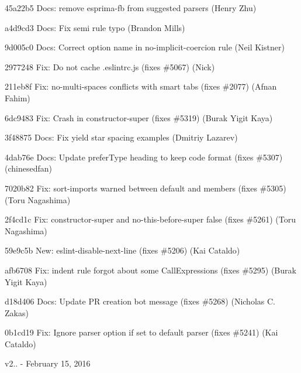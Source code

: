 \begin{DoxyItemize}
\item 45a22b5 Docs\+: remove esprima-\/fb from suggested parsers (Henry Zhu)
\item a4d9cd3 Docs\+: Fix semi rule typo (Brandon Mills)
\item 9d005c0 Docs\+: Correct option name in {\ttfamily no-\/implicit-\/coercion} rule (Neil Kistner)
\item 2977248 Fix\+: Do not cache {\ttfamily .eslintrc.\+js} (fixes \#5067) (Nick)
\item 211eb8f Fix\+: no-\/multi-\/spaces conflicts with smart tabs (fixes \#2077) (Afnan Fahim)
\item 6dc9483 Fix\+: Crash in {\ttfamily constructor-\/super} (fixes \#5319) (Burak Yigit Kaya)
\item 3f48875 Docs\+: Fix yield star spacing examples (Dmitriy Lazarev)
\item 4dab76e Docs\+: Update {\ttfamily prefer\+Type} heading to keep code format (fixes \#5307) (chinesedfan)
\item 7020b82 Fix\+: {\ttfamily sort-\/imports} warned between default and members (fixes \#5305) (Toru Nagashima)
\item 2f4cd1c Fix\+: {\ttfamily constructor-\/super} and {\ttfamily no-\/this-\/before-\/super} false (fixes \#5261) (Toru Nagashima)
\item 59e9c5b New\+: eslint-\/disable-\/next-\/line (fixes \#5206) (Kai Cataldo)
\item afb6708 Fix\+: {\ttfamily indent} rule forgot about some Call\+Expressions (fixes \#5295) (Burak Yigit Kaya)
\item d18d406 Docs\+: Update PR creation bot message (fixes \#5268) (Nicholas C. Zakas)
\item 0b1cd19 Fix\+: Ignore parser option if set to default parser (fixes \#5241) (Kai Cataldo)
\end{DoxyItemize}

v2.. -\/ February 15, 2016


